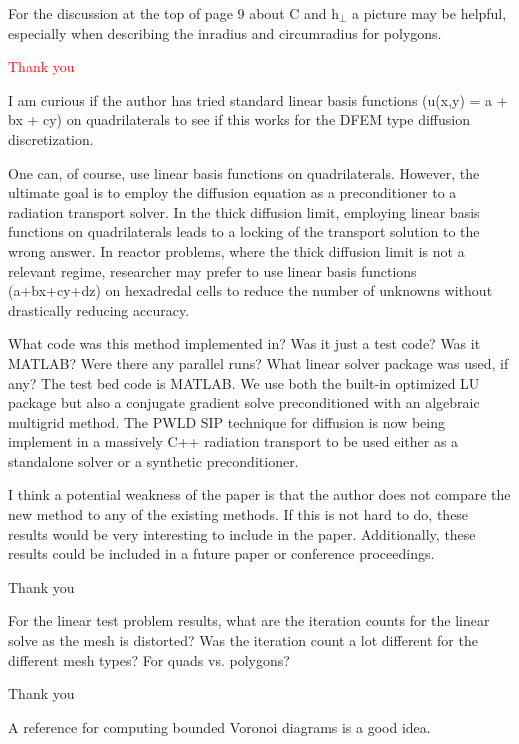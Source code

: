 \documentclass{article}
\newcommand{\tcr}[1]{\textcolor{red}{#1}}
\begin{document}
{
\color{blue}
For the discussion at the top of page 9 about C and h$_\perp$ a picture may be helpful, especially when
describing the inradius and circumradius for polygons.
}


\tcr{Thank you}
\bigskip


{
\color{blue}
I am curious if the author has tried standard linear basis functions (u(x,y) = a + bx + cy) on
quadrilaterals to see if this works for the DFEM type diffusion discretization.
}

One can, of course, use linear basis functions on quadrilaterals. However, the ultimate goal is to employ
the diffusion equation as a preconditioner to a radiation transport solver. In the thick diffusion limit,
employing linear basis functions on quadrilaterals leads to a locking of the transport solution to the 
wrong answer. In reactor problems, where the thick diffusion limit is not a relevant regime, researcher
may prefer to use linear basis functions (a+bx+cy+dz) on hexadredal cells to reduce the number of unknowns
without drastically reducing accuracy.

\bigskip

{
\color{blue}
What code was this method implemented in? Was it just a test code? Was it MATLAB? Were there any
parallel runs? What linear solver package was used, if any?
}
The test bed code is MATLAB. We use both the built-in optimized LU package but also a conjugate gradient solve
preconditioned with an algebraic multigrid method. The PWLD SIP technique for diffusion is now being 
implement in a massively C++ radiation transport to be used either as a standalone solver or a 
synthetic preconditioner. 



\bigskip


{
\color{blue}
I think a potential weakness of the paper is that the author does not compare the new method to any of
the existing methods. If this is not hard to do, these results would be very interesting to include in the
paper. Additionally, these results could be included in a future paper or conference proceedings.
}


Thank you
\bigskip


{
\color{blue}
For the linear test problem results, what are the iteration counts for the linear solve as the mesh is
distorted? Was the iteration count a lot different for the different mesh types? For quads vs. polygons?
}


Thank you
\bigskip


{
\color{blue}
A reference for computing bounded Voronoi diagrams is a good idea.
}
\end{document}
